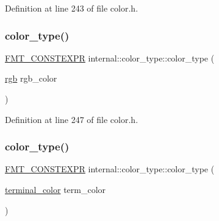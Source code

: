 Definition at line 243 of file color.\+h.

\mbox{\label{structinternal_1_1color__type_ae44cd569407f2aa65168a7fa8234a3f2}} 
\subsubsection{\texorpdfstring{color\+\_\+type()}{color\_type()}\hspace{0.1cm}{\footnotesize\ttfamily [3/4]}}
{\footnotesize\ttfamily \hyperlink{core_8h_a69201cb276383873487bf68b4ef8b4cd}{F\+M\+T\+\_\+\+C\+O\+N\+S\+T\+E\+X\+PR} internal\+::color\+\_\+type\+::color\+\_\+type (\begin{DoxyParamCaption}\item[{\hyperlink{structrgb}{rgb}}]{rgb\+\_\+color }\end{DoxyParamCaption})\hspace{0.3cm}{\ttfamily [inline]}}



Definition at line 247 of file color.\+h.

\mbox{\label{structinternal_1_1color__type_aa28b15cadf9646f33c7c25c2428befb9}} 
\subsubsection{\texorpdfstring{color\+\_\+type()}{color\_type()}\hspace{0.1cm}{\footnotesize\ttfamily [4/4]}}
{\footnotesize\ttfamily \hyperlink{core_8h_a69201cb276383873487bf68b4ef8b4cd}{F\+M\+T\+\_\+\+C\+O\+N\+S\+T\+E\+X\+PR} internal\+::color\+\_\+type\+::color\+\_\+type (\begin{DoxyParamCaption}\item[{\hyperlink{color_8h_a76f7aa9aae46c2ea7333dae7b531d6ac}{terminal\+\_\+color}}]{term\+\_\+color }\end{DoxyParamCaption})\hspace{0.3cm}{\ttfamily [inline]}}



